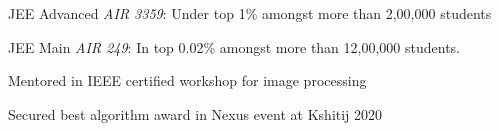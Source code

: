 \documentclass[]{deedy-resume-openfont}
\begin{document}
\begin{minipage}[t]{0.66\textwidth}
\vspace{\topsep} %
\begin{tightemize}

\item{JEE Advanced \emph{AIR 3359}:} Under top 1\% amongst more than 2,00,000 students \\
\item {JEE Main \emph{AIR 249}:} In top 0.02\% amongst more than 12,00,000 students. \\
\item {Mentored in IEEE certified workshop for image processing }\\
\item {Secured best algorithm award in Nexus event at Kshitij 2020}
\end{tightemize}
\sectionsep


\end{minipage} 
\end{document}
